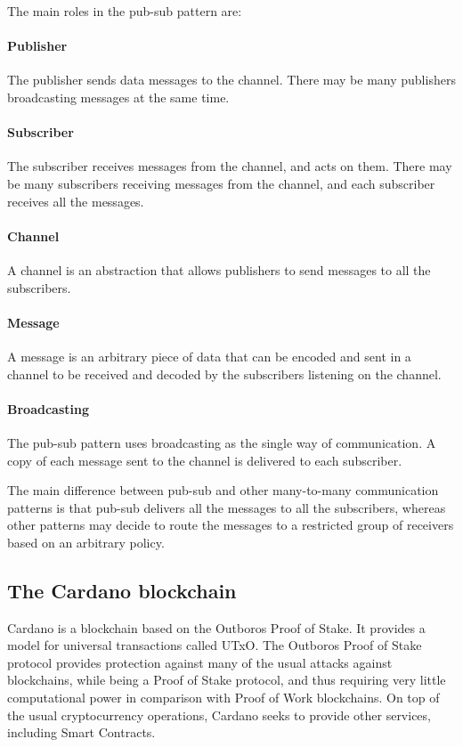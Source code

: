 \documentclass{article}
\begin{document}
The main roles in the pub-sub pattern are:
\paragraph{Publisher}
The publisher sends data messages to the channel. There may be many publishers broadcasting messages at the same time.

\paragraph{Subscriber}
The subscriber receives messages from the channel, and acts on them. There may be many subscribers receiving messages from the channel, and each subscriber receives all the messages.

\paragraph{Channel}
A channel is an abstraction that allows publishers to send messages to all the subscribers.

\paragraph{Message}
A message is an arbitrary piece of data that can be encoded and sent in a channel to be received and decoded by the subscribers listening on the channel.

\paragraph{Broadcasting}
The pub-sub pattern uses broadcasting as the single way of communication. A copy of each message sent to the channel is delivered to each subscriber.

The main difference between pub-sub and other many-to-many communication patterns is that pub-sub delivers all the messages to all the subscribers, whereas other patterns may decide to route the messages to a restricted group of receivers based on an arbitrary policy.

\subsection{The Cardano blockchain}
Cardano is a blockchain based on the Outboros Proof of Stake\cite{outboros}. It provides a model for universal transactions called UTxO. The Outboros Proof of Stake protocol provides protection against many of the usual attacks against blockchains, while being a Proof of Stake protocol, and thus requiring very little computational power in comparison with Proof of Work blockchains. On top of the usual cryptocurrency operations, Cardano seeks to provide other services, including Smart Contracts.
\end{document}
